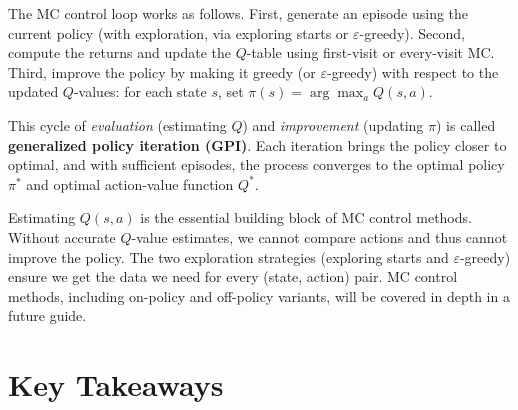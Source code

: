 \documentclass[journal, onecolumn]{IEEEtran}
\newcommand{\vocab}[1]{\textbf{\textcolor{Garnet}{#1}}}
\begin{document}
The MC control loop works as follows. First, generate an episode using the current policy (with exploration, via exploring starts or $\varepsilon$-greedy). Second, compute the returns and update the $Q$-table using first-visit or every-visit MC. Third, improve the policy by making it greedy (or $\varepsilon$-greedy) with respect to the updated $Q$-values: for each state $s$, set $\pi(s) = \arg\max_a Q(s,a)$.

This cycle of \textit{evaluation} (estimating $Q$) and \textit{improvement} (updating $\pi$) is called \vocab{generalized policy iteration (GPI)}. Each iteration brings the policy closer to optimal, and with sufficient episodes, the process converges to the optimal policy $\pi^*$ and optimal action-value function $Q^*$.

\begin{tcolorbox}[memorybox={Foundation for MC Control}]
Estimating $Q(s,a)$ is the essential building block of MC control methods. Without accurate $Q$-value estimates, we cannot compare actions and thus cannot improve the policy. The two exploration strategies (exploring starts and $\varepsilon$-greedy) ensure we get the data we need for every (state, action) pair. MC control methods, including on-policy and off-policy variants, will be covered in depth in a future guide.
\end{tcolorbox}

\section{Key Takeaways}
\end{document}
